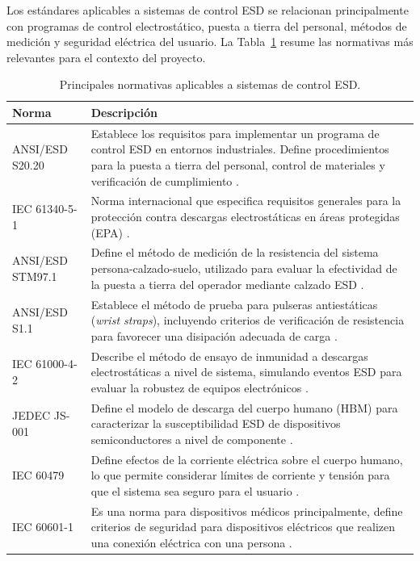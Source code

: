 Los estándares aplicables a sistemas de control ESD se relacionan principalmente con
programas de control electrostático, puesta a tierra del personal, métodos de medición y
seguridad eléctrica del usuario. La Tabla~\ref{tab:esd_normas} resume las normativas más
relevantes para el contexto del proyecto.

\begin{table}[H]
\centering
\caption{Principales normativas aplicables a sistemas de control ESD.}
\label{tab:esd_normas}
\begin{tabular}{|l|p{10cm}|}
\hline
\textbf{Norma} & \textbf{Descripción} \\
\hline
ANSI/ESD S20.20 &
Establece los requisitos para implementar un programa de control ESD en entornos
industriales. Define procedimientos para la puesta a tierra del personal, control de
materiales y verificación de cumplimiento \cite{ANSI_S2020_Blog}. \\
\hline
IEC 61340-5-1 &
Norma internacional que especifica requisitos generales para la protección contra
descargas electrostáticas en áreas protegidas (EPA) \cite{IEC61340_Preview}. \\
\hline
ANSI/ESD STM97.1 &
Define el método de medición de la resistencia del sistema persona-calzado-suelo,
utilizado para evaluar la efectividad de la puesta a tierra del operador mediante calzado
ESD \cite{STM97_ANSI}. \\
\hline
ANSI/ESD S1.1 &
Establece el método de prueba para pulseras antiestáticas (\textit{wrist straps}),
incluyendo criterios de verificación de resistencia para favorecer una disipación adecuada
de carga \cite{S1_1_ANSI}. \\
\hline
IEC 61000-4-2 &
Describe el método de ensayo de inmunidad a descargas electrostáticas a nivel de sistema,
simulando eventos ESD para evaluar la robustez de equipos electrónicos
\cite{IEC61000_ITU}. \\
\hline
JEDEC JS-001 &
Define el modelo de descarga del cuerpo humano (HBM) para caracterizar la susceptibilidad
ESD de dispositivos semiconductores a nivel de componente \cite{JEDEC_JTR001}. \\
\hline
IEC 60479 &
Define efectos de la corriente eléctrica sobre el cuerpo humano, lo que permite considerar
límites de corriente y tensión para que el sistema sea seguro para el usuario
\cite{IEC60479_Resume}. \\
\hline
IEC 60601-1 &
Es una norma para dispositivos médicos principalmente, define criterios de 
seguridad para dispositivos eléctricos que realizen una conexión eléctrica con una persona \cite{iec60601_1}. \\
\hline
\end{tabular}
\end{table}

